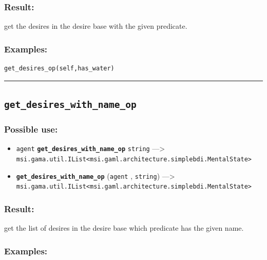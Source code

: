\documentclass[]{book}
\providecommand{\tightlist}{%
  \setlength{\itemsep}{0pt}\setlength{\parskip}{0pt}}
\theoremstyle{definition}
\theoremstyle{definition}
\theoremstyle{definition}
\theoremstyle{remark}
\begin{document}
\subsubsection{Result:}\label{result-199}

get the desires in the desire base with the given predicate.

\subsubsection{Examples:}\label{examples-152}

\begin{verbatim}
get_desires_op(self,has_water) 
\end{verbatim}

\begin{center}\rule{0.5\linewidth}{\linethickness}\end{center}

\subsection{\texorpdfstring{\texttt{get\_desires\_with\_name\_op}}{get\_desires\_with\_name\_op}}\label{get_desires_with_name_op}

\subsubsection{Possible use:}\label{possible-use-206}

\begin{itemize}
\tightlist
\item
  \texttt{agent} \textbf{\texttt{get\_desires\_with\_name\_op}}
  \texttt{string} ---\textgreater{}
  \texttt{msi.gama.util.IList\textless{}msi.gaml.architecture.simplebdi.MentalState\textgreater{}}
\item
  \textbf{\texttt{get\_desires\_with\_name\_op}} (\texttt{agent} ,
  \texttt{string}) ---\textgreater{}
  \texttt{msi.gama.util.IList\textless{}msi.gaml.architecture.simplebdi.MentalState\textgreater{}}
\end{itemize}

\subsubsection{Result:}\label{result-200}

get the list of desires in the desire base which predicate has the given
name.

\subsubsection{Examples:}\label{examples-153}
\end{document}
